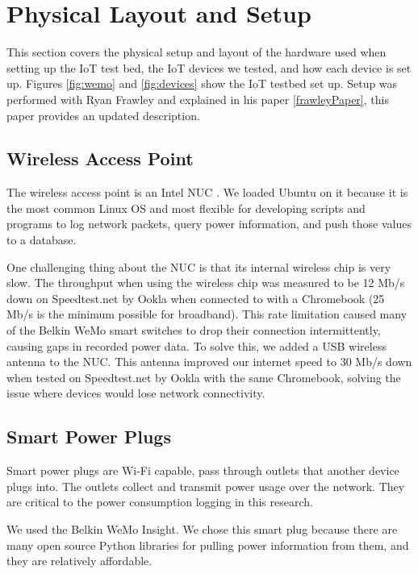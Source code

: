 \section{Physical Layout and Setup}
\label{Physical Layout and Setup}

This section covers the physical setup and layout of the hardware used when setting up the IoT test bed, the IoT devices we tested, and how each device is set up. Figures \ref{fig:wemo} and \ref{fig:devices} show the IoT testbed set up. Setup was performed with Ryan Frawley and explained in his paper \ref{frawleyPaper}, this paper provides an updated description.

\subsection{Wireless Access Point}
\label{Wireless Access Point}
The wireless access point is an Intel NUC \cite{nuc}. We loaded Ubuntu\cite{ubuntu} on it because it is the most common Linux OS \cite{linux} and most flexible for developing scripts and programs to log network packets, query power information, and push those values to a database.

One challenging thing about the NUC is that its internal wireless chip is very slow. The throughput when using the wireless chip was measured to be 12 Mb/s down on Speedtest.net by Ookla \cite{speedtest} when connected to with a Chromebook \cite{chromebook} (25 Mb/s is the minimum possible for broadband). This rate limitation caused many of the Belkin WeMo smart switches \cite{wemo} to drop their connection intermittently, causing gaps in recorded power data. To solve this, we added a USB wireless antenna to the NUC. This antenna improved our internet speed to 30 Mb/s down when tested on Speedtest.net by Ookla with the same Chromebook, solving the issue where devices would lose network connectivity.

\subsection{Smart Power Plugs}

Smart power plugs are Wi-Fi capable, pass through outlets that another device plugs into. The outlets collect and transmit power usage over the network. They are critical to the power consumption logging in this research.

We used the Belkin WeMo Insight. We chose this smart plug because there are many open source Python libraries for pulling power information from them, and they are relatively affordable.

